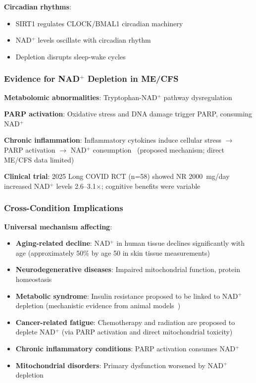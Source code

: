 \textbf{Circadian rhythms}:
\begin{itemize}
    \item SIRT1 regulates CLOCK/BMAL1 circadian machinery
    \item NAD$^+$ levels oscillate with circadian rhythm
    \item Depletion disrupts sleep-wake cycles
\end{itemize}

\subsubsection{Evidence for NAD$^+$ Depletion in ME/CFS}

\textbf{Metabolomic abnormalities}: Tryptophan-NAD$^+$ pathway dysregulation~\cite{heng2025mecfs}

\textbf{PARP activation}: Oxidative stress and DNA damage trigger PARP, consuming NAD$^+$~\cite{Dehhaghi2022AD}

\textbf{Chronic inflammation}: Inflammatory cytokines induce cellular stress $\rightarrow$ PARP activation $\rightarrow$ NAD$^+$ consumption~\cite{Dehhaghi2022AD} (proposed mechanism; direct ME/CFS data limited)

\textbf{Clinical trial}: 2025 Long COVID RCT (n=58) showed NR 2000~mg/day increased NAD$^+$ levels 2.6--3.1$\times$; cognitive benefits were variable~\cite{Wu2025NRLongCOVID}

\subsubsection{Cross-Condition Implications}

\textbf{Universal mechanism affecting}:
\begin{itemize}
    \item \textbf{Aging-related decline}: NAD$^+$ in human tissue declines significantly with age (approximately 50\% by age 50 in skin tissue measurements)~\cite{Massudi2012nad}
    \item \textbf{Neurodegenerative diseases}: Impaired mitochondrial function, protein homeostasis~\cite{Dehhaghi2022AD}
    \item \textbf{Metabolic syndrome}: Insulin resistance proposed to be linked to NAD$^+$ depletion (mechanistic evidence from animal models~\cite{Stromsdorfer2016NADinsulin})
    \item \textbf{Cancer-related fatigue}: Chemotherapy and radiation are proposed to deplete NAD$^+$ (via PARP activation and direct mitochondrial toxicity)~\cite{Dehhaghi2022AD}
    \item \textbf{Chronic inflammatory conditions}: PARP activation consumes NAD$^+$~\cite{Dehhaghi2022AD}
    \item \textbf{Mitochondrial disorders}: Primary dysfunction worsened by NAD$^+$ depletion
\end{itemize}

